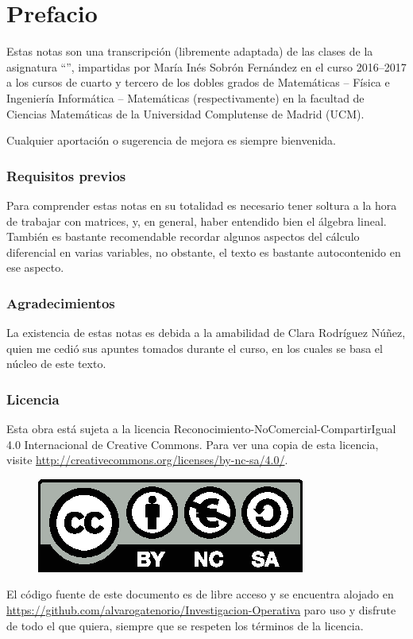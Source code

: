 \chapter*{Prefacio}
Estas notas son una transcripción (libremente adaptada) de las clases de la asignatura ``'', impartidas por María Inés Sobrón Fernández en el curso 2016--2017 a los cursos de cuarto y tercero de los dobles grados de  Matemáticas -- Física e Ingeniería Informática -- Matemáticas (respectivamente) en la facultad de Ciencias Matemáticas de la Universidad Complutense de Madrid (UCM).

Cualquier aportación o sugerencia de mejora es siempre bienvenida.
\subsection*{Requisitos previos}
Para comprender estas notas en su totalidad es necesario tener soltura a la hora de trabajar con matrices, y, en general, haber entendido bien el álgebra lineal. También es bastante recomendable recordar algunos aspectos del cálculo diferencial en varias variables, no obstante, el texto es bastante autocontenido en ese aspecto.
\subsection*{Agradecimientos}
La existencia de estas notas es debida a la amabilidad de Clara Rodríguez Núñez, quien me cedió sus apuntes tomados durante el curso, en los cuales se basa el núcleo de este texto.
\subsection*{Licencia}
Esta obra está sujeta a la licencia Reconocimiento-NoComercial-CompartirIgual 4.0 Internacional de Creative Commons. Para ver una copia de esta licencia, visite \url{http://creativecommons.org/licenses/by-nc-sa/4.0/}.
\begin{figure}[h]
	\centering
	\includegraphics[scale=1]{img/licencia}
\end{figure}

El código fuente de este documento es de libre acceso y se encuentra alojado en \url{https://github.com/alvarogatenorio/Investigacion-Operativa} paro uso y disfrute de todo el que quiera, siempre que se respeten los términos de la licencia.